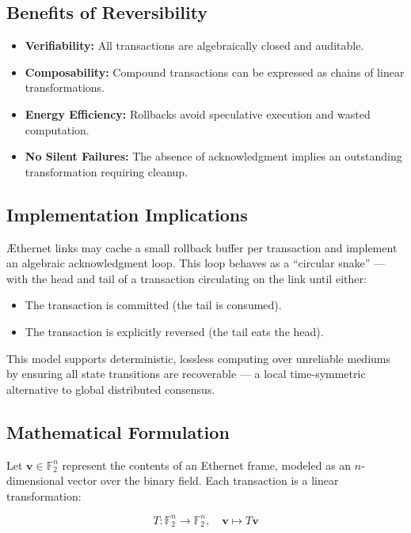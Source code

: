 \subsection*{Benefits of Reversibility}

\begin{itemize}
  \item \textbf{Verifiability:} All transactions are algebraically closed and auditable.
  \item \textbf{Composability:} Compound transactions can be expressed as chains of linear transformations.
  \item \textbf{Energy Efficiency:} Rollbacks avoid speculative execution and wasted computation.
  \item \textbf{No Silent Failures:} The absence of acknowledgment implies an outstanding transformation requiring cleanup.
\end{itemize}

\subsection*{Implementation Implications}

\AE thernet links may cache a small rollback buffer per transaction and implement an algebraic acknowledgment loop. This loop behaves as a “circular snake” — with the head and tail of a transaction circulating on the link until either:
\begin{itemize}
  \item The transaction is committed (the tail is consumed).
  \item The transaction is explicitly reversed (the tail eats the head).
\end{itemize}

This model supports deterministic, lossless computing over unreliable mediums by ensuring all state transitions are recoverable — a local time-symmetric alternative to global distributed consensus.

\subsection*{Mathematical Formulation}

Let $\mathbf{v} \in \mathbb{F}_2^n$ represent the contents of an Ethernet frame, modeled as an $n$-dimensional vector over the binary field. Each transaction is a linear transformation:

\[
T: \mathbb{F}_2^n \rightarrow \mathbb{F}_2^n,\quad \mathbf{v} \mapsto T\mathbf{v}
\]

